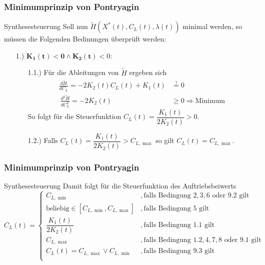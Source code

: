 \documentclass[aspectratio=169]{beamer}
\begin{document}
\begin{frame}
  \frametitle{Minimumprinzip von Pontryagin}
  \begin{block}{Synthesesteuerung}  
  \scriptsize
    Soll nun $\tilde{H}(X^{\ast}(t),C_L(t),\lambda(t))$ minimal werden, so müssen die Folgenden Bedinungen überprüft werden:
    \scriptsize
    \begin{enumerate}
        \item[1.)] $\mathbf{K_1(t) < 0 \wedge K_2(t)} < 0$:
          \scriptsize
        \begin{enumerate}
            \item[1.1.)] Für die Ableitungen von $\tilde{H}$ ergeben sich
            \[\begin{split}
            \frac{d \tilde{H}}{d C_L} = - 2 K_2(t) C_L(t) + K_1(t) &\stackrel{!}{=} 0 \\\
            \frac{d^2 \tilde{H}}{d C_L^2} = - 2 K_2(t) &\geq 0 \Rightarrow \text{Minimum}
            \end{split}\]
            So folgt für die Steuerfunktion $C_L(t) = \dfrac{K_1(t)}{2 K_2(t)} > 0$.
            \item[1.2.)] Falls $C_L(t) = \dfrac{K_1(t)}{2 K_2(t)} > C_{L, \max}$ so gilt  $C_L(t) = C_{L, \max}$.
        \end{enumerate}
        \end{enumerate}
      \end{block}
\end{frame}

\begin{frame}
  \frametitle{Minimumprinzip von Pontryagin}
  \begin{block}{Synthesesteuerung}  
  \scriptsize
  Damit folgt für die Steuerfunktion des Auftriebsbeiwerts
\[C_L(t) = \left\lbrace 
\begin{array}{ll}
C_{L, \min} & ,\text{falls Bedingung } 2,3,6 \text{ oder } 9.2 \text{ gilt} \\ 
\text{beliebig} \in [C_{L, \min},C_{L, \max}] & ,\text{falls Bedingung } 5 \text{ gilt} \\ 
\dfrac{K_1(t)}{2 K_2(t)} & ,\text{falls Bedingung } 1.1 \text{ gilt} \\ 
C_{L, \max} & ,\text{falls Bedingung } 1.2,4,7,8 \text{ oder } 9.1 \text{ gilt} \\
C_L(t) = C_{L,\max} \vee C_{L,\min} & ,\text{falls Bedingung } 9.3 \text{ gilt} \\ 
\end{array} 
\right.\]
      \end{block}
\end{frame}
\end{document}
